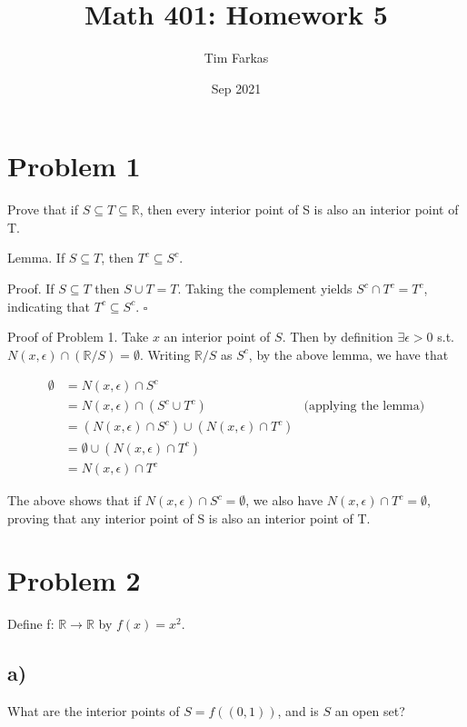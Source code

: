 \documentclass{article}
\title{Math 401: Homework 5}
\author{Tim Farkas}
\date{Sep 2021}
\begin{document}
\maketitle

\section*{Problem 1}

Prove that if $S \subseteq T \subseteq \mathbb{R}$, then every interior point of S is also an interior point of T. 

Lemma. If $S \subseteq T$, then $T^c \subseteq S^c$. 

Proof. If $S \subseteq T$ then $S \cup T = T$. Taking the complement yields $S^c \cap T^c = T^c$, indicating that $T^c \subseteq S^c$. $\square$

Proof of Problem 1. Take $x$ an interior point of $S$. 
Then by definition $\exists \epsilon > 0$ s.t. $N(x, \epsilon) \cap (\mathbb{R}/S) = \emptyset$. 
Writing $\mathbb{R}/S$ as $S^c$, by the above lemma, we have that 

\begin{align*}
        \emptyset &= N(x, \epsilon) \cap S^c \\  
          &= N(x, \epsilon) \cap (S^c \cup T^c) &\text{(applying the lemma)} \\
          &= (N(x, \epsilon) \cap S^c) \cup (N(x, \epsilon) \cap T^c) \\
          &= \emptyset \cup (N(x, \epsilon) \cap T^c) \\
          &= N(x, \epsilon) \cap T^c
\end{align*}

The above shows that if $N(x, \epsilon) \cap S^c = \emptyset$, we also have $N(x, \epsilon) \cap T^c = \emptyset$, proving that any interior point of S is also an interior point of T. 

\section*{Problem 2}

Define f: $\mathbb{R} \rightarrow \mathbb{R}$ by $f(x) = x^2$. 

\subsection*{a)}

What are the interior points of $S = f((0, 1))$, and is $S$ an open set?
\end{document}
